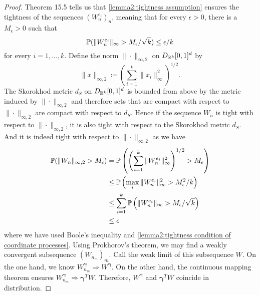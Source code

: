 \begin{proof}
    \cite{[4]billingsley1968convergence} Theorem 15.5 tells us that \eqref{lemma2:tightness assumption} ensures the tightness of the sequences $(W_n^{e_i})_n$, meaning that for every $\epsilon > 0$, there is a $M_\epsilon > 0$ such that
    \begin{equation} \label{lemma2:tightness condition of coordinate processes} 
        \mathbb{P}(\|W_n^{e_i}\|_\infty > M_\epsilon/\sqrt{k}) \leq \epsilon/k 
    \end{equation}
    for every $i = 1, ..., k$. Define the norm $\| \cdot \|_{\infty, 2}$ on $D_{\mathbb{R}^k}[0,1]^d$ by
    \[ \| x \|_{\infty, 2} \coloneqq \left( \sum\limits_{i=1}^k \|x_i\|_\infty^2 \right)^{1/2}. \]
    The Skorokhod metric $d_S$ on $D_{\mathbb{R}^k}[0,1]^d$ is bounded from above by the metric induced by $\| \cdot \|_{\infty, 2}$ and therefore sets that are compact with respect to $\| \cdot \|_{\infty, 2}$ are compact with respect to $d_S$. Hence if the sequence $W_n$ is tight with respect to $\| \cdot \|_{\infty, 2}$, it is also tight with respect to the Skorokhod metric $d_S$. And it is indeed tight with respect to $\| \cdot \|_{\infty, 2}$ as we have
    \begin{align*} 
        \mathbb{P}(\| W_n \|_{\infty, 2} > M_\epsilon) 
        & = \mathbb{P}\left( \left( \sum\limits_{i=1}^k \|W_n^{e_i}\|_\infty^2 \right)^{1/2} > M_\epsilon \right) \\
        & \leq \mathbb{P}\left( \max\limits_{i} \|W_n^{e_i}\|_\infty^2 > M^2_\epsilon/k \right) \\
        & \leq \sum\limits_{i=1}^k \mathbb{P}\left( \|W_n^{e_i}\|_\infty > M_\epsilon/\sqrt{k}  \right) \\
        & \leq \epsilon
    \end{align*}
    where we have used Boole's inequality and \eqref{lemma2:tightness condition of coordinate processes}. Using Prokhorov's theorem, we may find a weakly convergent subsequence $(W_{n_m})_m$. Call the weak limit of this subsequence $W$. On the one hand, we know $W_{n_m}^{\boldsymbol{\gamma}} \Rightarrow W^{\boldsymbol{\gamma}}$. On the other hand, the continuous mapping theorem ensures $W_{n_m}^{\boldsymbol{\gamma}} \Rightarrow {\boldsymbol{\gamma}}^T W$. Therefore, $W^{\boldsymbol{\gamma}}$ and ${\boldsymbol{\gamma}}^T W$ coincide in distribution.


\end{proof}
